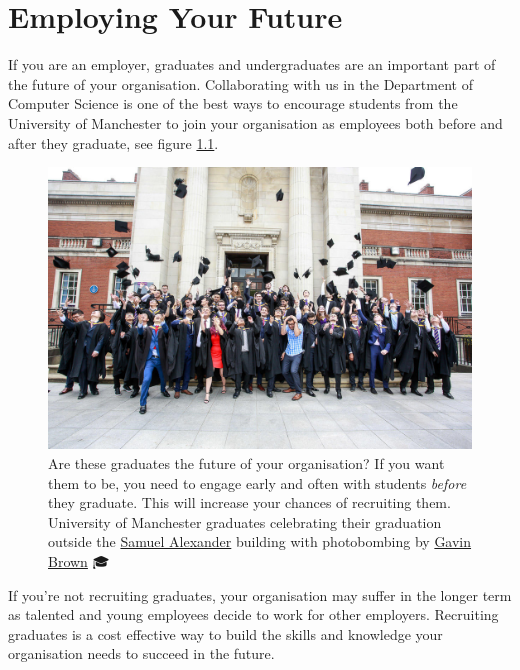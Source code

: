 \documentclass[
  12pt,
]{book}
\begin{document}
\hypertarget{employers}{%
\chapter{Employing Your Future}\label{employers}}

If you are an employer, graduates and undergraduates are an important part of the future of your organisation. Collaborating with us in the Department of Computer Science is one of the best ways to encourage students from the University of Manchester to join your organisation as employees both before and after they graduate, see figure \ref{fig:graduating-your-fig}.

\begin{figure}

{\centering \includegraphics[width=1\linewidth]{images/employing-your-future} 

}

\caption{Are these graduates the future of your organisation? If you want them to be, you need to engage early and often with students \emph{before} they graduate. This will increase your chances of recruiting them. University of Manchester graduates celebrating their graduation outside the \href{https://en.wikipedia.org/wiki/Samuel_Alexander}{Samuel Alexander} building with photobombing by \href{https://profgavinbrown.github.io/}{Gavin Brown} 🎓}\label{fig:graduating-your-fig}
\end{figure}



If you're not recruiting graduates, your organisation may suffer in the longer term as talented and young employees decide to work for other employers. Recruiting graduates is a cost effective way to build the skills and knowledge your organisation needs to succeed in the future.
\end{document}
